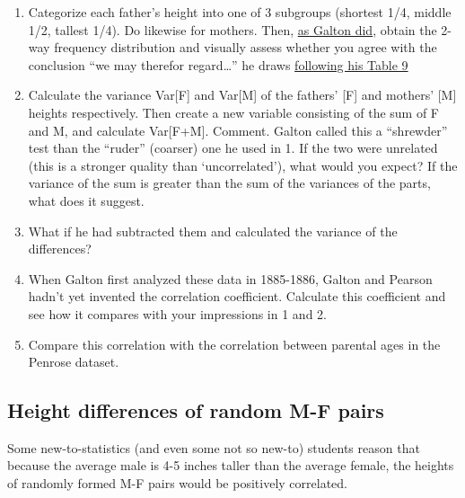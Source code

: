 \documentclass[]{book}
\begin{document}
\begin{enumerate}
\def\labelenumi{\arabic{enumi}.}
\item
  Categorize each father's height into one of 3 subgroups (shortest 1/4, middle 1/2, tallest 1/4). Do likewise for mothers. Then, \href{http://www.biostat.mcgill.ca/hanley/statbook/GaltonHeightCouples.png}{as Galton did}, obtain the 2-way frequency distribution and visually assess whether
  you agree with the conclusion ``we may therefor regard\ldots{}'' he draws \href{http://www.biostat.mcgill.ca/hanley/statbook/GaltonHeightCouples.png}{following his Table 9}
\item
  Calculate the variance Var{[}F{]} and Var{[}M{]} of the fathers' {[}F{]} and mothers' {[}M{]} heights respectively. Then create a new variable consisting of the sum of F and M, and calculate Var{[}F+M{]}. Comment. Galton called this a ``shrewder'' test than the ``ruder'' (coarser) one he used in 1. If the two were unrelated (this is a stronger quality than `uncorrelated'), what would you expect? If the variance of the sum is greater than the sum of the variances of the parts, what does it suggest.
\item
  What if he had subtracted them and calculated the variance of the differences?
\item
  When Galton first analyzed these data in 1885-1886, Galton and Pearson hadn't yet invented the correlation coefficient. Calculate this coefficient and see how it compares with your impressions in 1 and 2.
\item
  Compare this correlation with the correlation between parental ages in the Penrose dataset.
\end{enumerate}

\hypertarget{height-differences-of-random-m-f-pairs}{%
\subsection{Height differences of random M-F pairs}\label{height-differences-of-random-m-f-pairs}}

Some new-to-statistics (and even some not so new-to) students reason that because the average male is 4-5 inches taller than the average female, the heights of randomly formed M-F pairs would be positively correlated.
\end{document}
